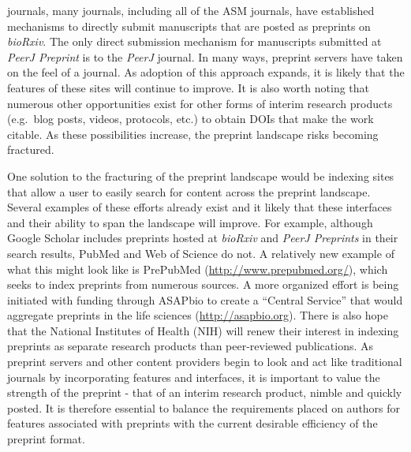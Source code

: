 \documentclass[11pt,]{article}
\begin{document}
journals, many journals, including all of the ASM journals, have
established mechanisms to directly submit manuscripts that are posted as
preprints on \emph{bioRxiv}. The only direct submission mechanism for
manuscripts submitted at \emph{PeerJ Preprint} is to the \emph{PeerJ}
journal. In many ways, preprint servers have taken on the feel of a
journal. As adoption of this approach expands, it is likely that the
features of these sites will continue to improve. It is also worth
noting that numerous other opportunities exist for other forms of
interim research products (e.g.~blog posts, videos, protocols, etc.) to
obtain DOIs that make the work citable. As these possibilities increase,
the preprint landscape risks becoming fractured.

One solution to the fracturing of the preprint landscape would be
indexing sites that allow a user to easily search for content across the
preprint landscape. Several examples of these efforts already exist and
it likely that these interfaces and their ability to span the landscape
will improve. For example, although Google Scholar includes preprints
hosted at \emph{bioRxiv} and \emph{PeerJ Preprints} in their search
results, PubMed and Web of Science do not. A relatively new example of
what this might look like is PrePubMed
(\url{http://www.prepubmed.org/}), which seeks to index preprints from
numerous sources. A more organized effort is being initiated with
funding through ASAPbio to create a ``Central Service'' that would
aggregate preprints in the life sciences (\url{http://asapbio.org}).
There is also hope that the National Institutes of Health (NIH) will
renew their interest in indexing preprints as separate research products
than peer-reviewed publications. As preprint servers and other content
providers begin to look and act like traditional journals by
incorporating features and interfaces, it is important to value the
strength of the preprint - that of an interim research product, nimble
and quickly posted. It is therefore essential to balance the
requirements placed on authors for features associated with preprints
with the current desirable efficiency of the preprint format.
\end{document}
